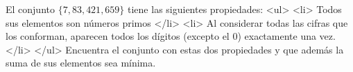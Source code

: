 El conjunto $\{7,83,421,659\}$ tiene las siguientes propiedades:
<ul>
<li> Todos sus elementos son números primos </li>
<li> Al considerar todas las cifras que los conforman, aparecen todos los dígitos (excepto el $0$) exactamente una vez. </li>
</ul>
Encuentra el conjunto con estas dos propiedades y que además la suma de sus elementos sea mínima.